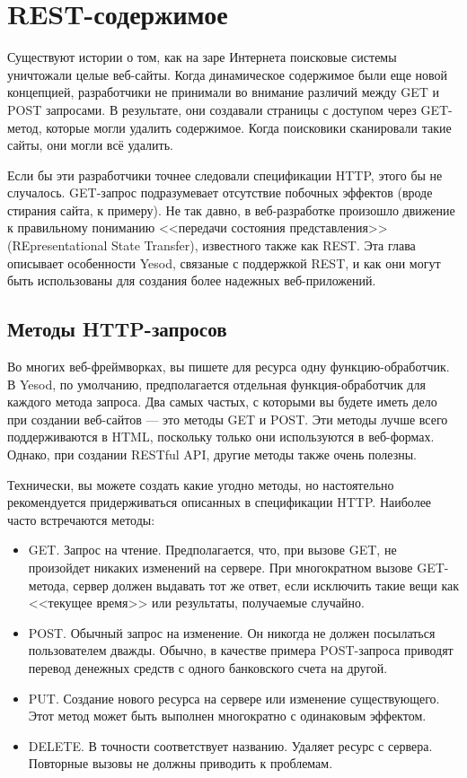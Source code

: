\chapter{REST-содержимое}

Существуют истории о том, как  на заре Интернета поисковые системы
уничтожали целые веб-сайты. Когда динамическое содержимое были еще новой концепцией,
разработчики не принимали во внимание различий между GET и POST запросами. В результате,
они создавали страницы с доступом через GET-метод, которые могли удалить содержимое. Когда
поисковики сканировали такие сайты, они могли всё удалить.

Если бы эти разработчики точнее следовали спецификации HTTP, этого бы не случалось.
GET-запрос подразумевает отсутствие побочных эффектов (вроде стирания сайта, к примеру).
Не так давно, в веб-разработке произошло движение к правильному пониманию <<передачи
состояния представления>> (REpresentational State Transfer), известного также как REST.
Эта
глава описывает особенности Yesod, связаные с поддержкой REST, и как они могут быть
использованы для создания более надежных веб-приложений.

\section{Методы HTTP-запросов}

Во многих веб-фреймворках, вы пишете для ресурса одну функцию-обработчик. В
Yesod, по умолчанию, предполагается отдельная функция-обработчик для каждого метода
запроса. Два самых частых, с которыми вы будете иметь дело при создании веб-сайтов
--- это методы GET и POST. Эти методы лучше всего поддерживаются в HTML, поскольку только
они используются в веб-формах. Однако, при создании RESTful API, другие методы также очень
полезны.

Технически, вы можете создать какие угодно методы, но настоятельно рекомендуется
придерживаться описанных в спецификации HTTP. Наиболее часто встречаются методы:
\begin{itemize}
 \item GET. Запрос на чтение. Предполагается, что, при вызове GET, не произойдет никаких
 изменений на сервере. При многократном вызове GET-метода, сервер должен выдавать тот же
ответ, если исключить такие вещи как <<текущее время>> или результаты, получаемые
случайно.
 \item POST. Обычный запрос на изменение. Он никогда не должен посылаться пользователем
дважды. Обычно, в качестве примера POST-запроса приводят перевод денежных средств с
одного банковского счета на другой.
 \item PUT. Создание нового ресурса на сервере или изменение существующего. Этот метод
 может быть выполнен многократно с одинаковым эффектом.
 \item DELETE. В точности соответствует названию. Удаляет ресурс с сервера. Повторные
 вызовы не должны приводить к проблемам.
\end{itemize}

